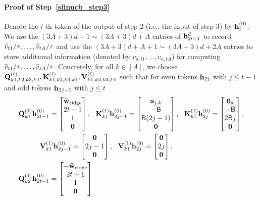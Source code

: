 \paragraph{Proof of Step~\ref{slinucb_step3}}
Denote the $i$-th token  of the output of step 2 (i.e., the input of step 3) by ${\mathbf h}_i^{(0)}$. 
We use the $(3A+3)d+1\sim (3A+3)d+A $ entries of ${\mathbf h}_{2t-1}^{{d}}$ to record $\widehat v_{t1}/{\tau},\ldots,\widehat v_{tA}/{\tau}$ and  use the $(3A+3)d+A+1\sim (3A+3)d+2A $ entries to store additional information (denoted by $ v_{a,t1},\ldots, v_{a,tA}$) for computing $ \widehat v_{t1}/{\tau},\ldots, \widehat  v_{tA}/{\tau}$. Concretely, for all $k\in[A]$, we choose 
${\mathbf Q}_{k1,k2,k3,k4}^{(\ell)},{\mathbf K}_{k1,k2,k3,k4}^{(\ell)},{\mathbf V}_{k1,k2,k3,k4}^{(\ell)}$ such that   for even tokens ${\mathbf h}_{2j}$ with $j\leq t-1$ and odd tokens ${\mathbf h}_{2j-1}$ with $j\leq t$
\begin{align*}
    &{\mathbf Q}^{(1)}_{k1}{\mathbf h}^{(0)}_{2t-1}=\begin{bmatrix}
        \widehat{{\mathbf w}}_{{\rm ridge}} \\2t-1\\ 1\\{\mathbf 0}
    \end{bmatrix},~~ {\mathbf K}^{(1)}_{k1}{\mathbf h}^{(0)}_{2j-1}=\begin{bmatrix}
        {\mathbf a}_{j,k}\\  -{\mathsf{B}} \\ {\mathsf{B}} (2j-1)\\{\mathbf 0}
    \end{bmatrix},~~ 
    {\mathbf K}^{(1)}_{k1}{\mathbf h}^{(0)}_{2j}=\begin{bmatrix}
        {\mathbf 0}_d\\  -{\mathsf{B}} \\ 2{\mathsf{B}} j\\{\mathbf 0}
    \end{bmatrix},\\
    &~~~\qquad{\mathbf V}^{(1)}_{k1}{\mathbf h}^{(0)}_{2j-1}=\begin{bmatrix}
        {\mathbf 0}\\ 2j-1 \\ {\mathbf 0}
\end{bmatrix},~~{\mathbf V}^{(1)}_{k1}{\mathbf h}^{(0)}_{2j}=\begin{bmatrix}
        {\mathbf 0}\\ 2j \\ {\mathbf 0}
    \end{bmatrix},\\
    &
    {\mathbf Q}^{(1)}_{k2}{\mathbf h}^{(0)}_{2t-1}=\begin{bmatrix}
        -\widehat{{\mathbf w}}_{{\rm ridge}} \\2t-1\\1\\{\mathbf 0}

\end{bmatrix}
\end{align*}
